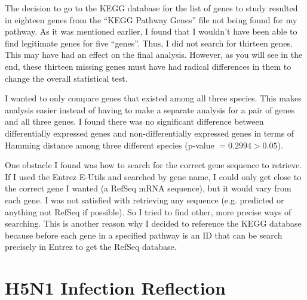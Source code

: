 \documentclass[12pt, a4paper]{report}
\begin{document}
The decision to go to the KEGG database for the list of genes to study resulted in eighteen genes from the ``KEGG Pathway Genes'' file not being found for my pathway. As it was mentioned earlier, I found that I wouldn't have been able to find legitimate genes for five ``genes''. Thus, I did not search for thirteen genes. This may have had an effect on the final analysis. However, as you will see in the end, these thirteen missing genes must have had radical differences in them to change the overall statistical test.

I wanted to only compare genes that existed among all three species. This makes analysis easier instead of having to make a separate analysis for a pair of genes and all three genes. I found there was no significant difference between differentially expressed genes and non-differentially expressed genes in terms of Hamming distance among three different species (p-value $= 0.2994 > 0.05$).

One obstacle I found was how to search for the correct gene sequence to retrieve. If I used the Entrez E-Utils and searched by gene name, I could only get close to the correct gene I wanted (a RefSeq mRNA sequence), but it would vary from each gene. I was not satisfied with retrieving any sequence (e.g. predicted or anything not RefSeq if possible). So I tried to find other, more precise ways of searching. This is another reason why I decided to reference the KEGG database because before each gene in a specified pathway is an ID that can be search precisely in Entrez to get the RefSeq database. 

\section*{H5N1 Infection Reflection}

\end{document}
